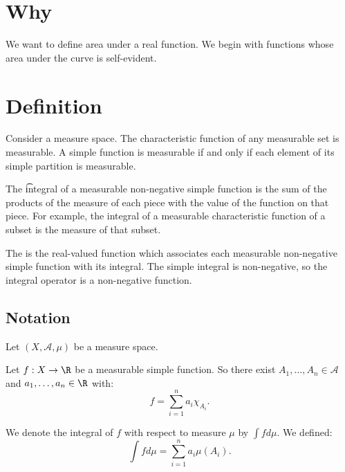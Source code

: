 

\section*{Why}

We want to define area
under a real function.
We begin with functions
whose area under the curve
is self-evident.

\section*{Definition}

Consider a measure space.
The characteristic function
of any measurable set
is measurable.
A simple function is measurable
if and only if
each element of
its simple partition
is measurable.

The \t{integral} of a measurable non-negative simple function is the sum of the products of the measure of each piece with the value of the function on that piece.
For example, the integral of a measurable characteristic function of a subset is the measure of that subset.

The
is the real-valued function
which associates
each measurable non-negative simple
function with its integral.
The simple integral is non-negative,
so the integral operator is
a non-negative function.

\subsection*{Notation}

Let $(X, \mathcal{A} , \mu )$ be a measure space.


Let $f: X \to \R $ be a measurable simple function.
So there exist $A_1, \dots , A_n \in \mathcal{A} $ and $a_1, \dots , a_n \in \R $ with:
    \[
f = \sum_{i = 1}^{n} a_i \chi _{A_i}.
    \]

We denote the integral of $f$ with respect to measure $\mu $ by $\int  f d\mu $.
We defined:
    \[
\int  f d\mu  = \sum_{i = 1}^{n} a_i \mu (A_i).
    \]
